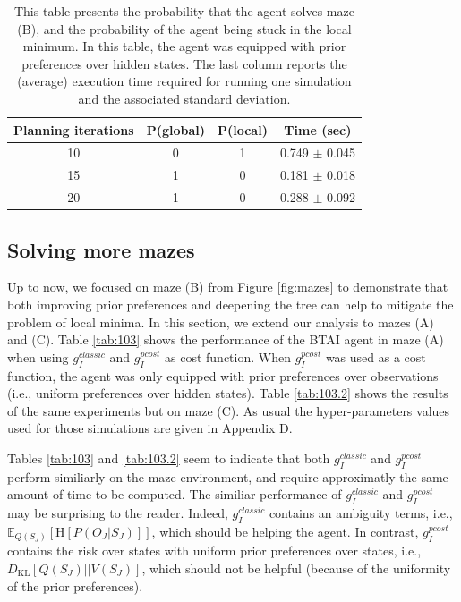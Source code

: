 \documentclass[twoside,11pt]{article}
\newcommand{\kl}[2]{D_{\mathrm{KL}} \left[ \left. \left. #1 \right|\right| #2 \right] }
\begin{document}
\begin{table}[H]
\centering
\begin{tabular}{ |c|c|c|c| }
 \hline
 Planning iterations & P(global) & P(local) & Time (sec)\\
 \hline
 10 & 0 & 1 & 0.749 $\pm$ 0.045\\
 \hline
 15 & 1 & 0 & 0.181 $\pm$ 0.018\\
 \hline
 20 & 1 & 0 & 0.288 $\pm$ 0.092\\
 \hline
\end{tabular}
\caption{This table presents the probability that the agent solves maze (B), and the probability of the agent being stuck in the local minimum. In this table, the agent was equipped with prior preferences over hidden states. The last column reports the (average) execution time required for running one simulation and the associated standard deviation.}
\label{tab:2.1}
\end{table}

\subsection{Solving more mazes}\label{sec:results_costs}

Up to now, we focused on maze (B) from Figure \ref{fig:mazes} to demonstrate that both improving prior preferences and deepening the tree can help to mitigate the problem of local minima. In this section, we extend our analysis to mazes (A) and (C). Table \ref{tab:103} shows the performance of the BTAI agent in maze (A) when using $g^{classic}_I$ and $g^{pcost}_I$ as cost function. When $g^{pcost}_I$ was used as a cost function, the agent was only equipped with prior preferences over observations (i.e., uniform preferences over hidden states). Table \ref{tab:103.2} shows the results of the same experiments but on maze (C). As usual the hyper-parameters values used for those simulations are given in Appendix D.

Tables \ref{tab:103} and \ref{tab:103.2} seem to indicate that both $g^{classic}_I$ and $g^{pcost}_I$ perform similiarly on the maze environment, and require approximatly the same amount of time to be computed. The similiar performance of $g^{classic}_I$ and $g^{pcost}_I$ may be surprising to the reader. Indeed, $g^{classic}_I$ contains an ambiguity terms, i.e., $\mathbb{E}_{Q(S_J)}[\text{H}[P(O_J | S_J)]]$, which should be helping the agent. In contrast, $g^{pcost}_I$ contains the risk over states with uniform prior preferences over states, i.e., $\kl{Q(S_J)}{V(S_J)}$, which should not be helpful (because of the uniformity of the prior preferences).
\end{document}
